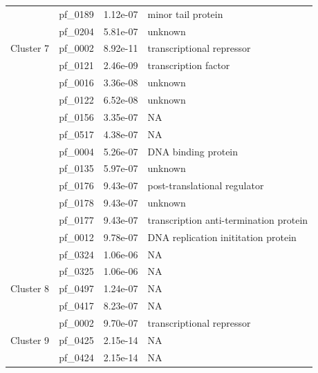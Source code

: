 \begin{table}
\begin{lrbox}{\rightbox}
\begin{tabular}[t]{llll}
                                        & pf\_0189 & 1.12e-07 & minor tail protein \\ 
                                        & pf\_0204 & 5.81e-07 & unknown \\ 
            \midrule
            \multirow{1}{*}{Cluster 7} & pf\_0002 & 8.92e-11 & transcriptional repressor \\ 
                                        & pf\_0121 & 2.46e-09 & transcription factor  \\ 
                                        & pf\_0016 & 3.36e-08 & unknown \\ 
                                        & pf\_0122 & 6.52e-08 & unknown \\ 
                                        & pf\_0156 & 3.35e-07 & NA \\ 
                                        & pf\_0517 & 4.38e-07 & NA \\ 
                                        & pf\_0004 & 5.26e-07 & DNA binding protein \\ 
                                        & pf\_0135 & 5.97e-07 & unknown \\ 
                                        & pf\_0176 & 9.43e-07 & post-translational regulator \\ 
                                        & pf\_0178 & 9.43e-07 & unknown \\ 
                                        & pf\_0177 & 9.43e-07 & transcription anti-termination protein \\ 
                                        & pf\_0012 & 9.78e-07 & DNA replication inititation protein \\ 
                                        & pf\_0324 & 1.06e-06 & NA \\ 
                                        & pf\_0325 & 1.06e-06 & NA \\ 
            \midrule
            \multirow{1}{*}{Cluster 8} & pf\_0497 & 1.24e-07 & NA \\ 
                                        & pf\_0417 & 8.23e-07 & NA \\ 
                                        & pf\_0002 & 9.70e-07 & transcriptional repressor \\ 
            \midrule
            \multirow{1}{*}{Cluster 9} & pf\_0425 & 2.15e-14 & NA \\ 
                                        & pf\_0424 & 2.15e-14 & NA \\ 

\end{tabular}
\end{lrbox}
\end{table}
